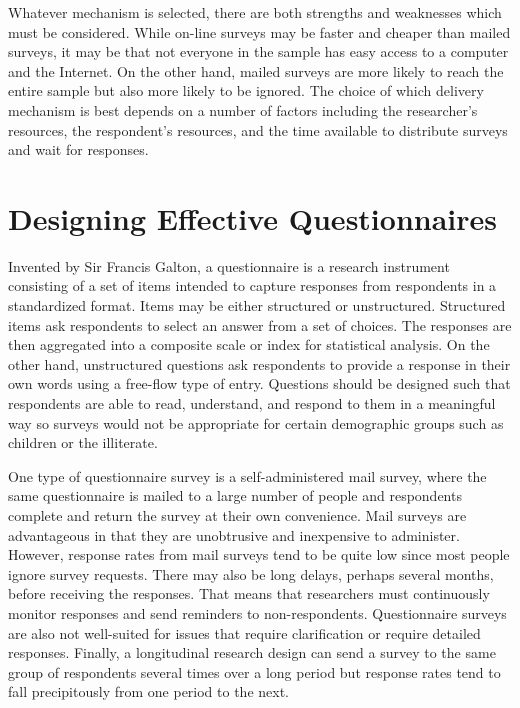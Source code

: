 Whatever mechanism is selected, there are both strengths and weaknesses which must be considered. While on-line surveys may be faster and cheaper than mailed surveys, it may be that not everyone in the sample has easy access to a computer and the Internet. On the other hand, mailed surveys are more likely to reach the entire sample but also more likely to be ignored. The choice of which delivery mechanism is best depends on a number of factors including the researcher's resources, the respondent's resources, and the time available to distribute surveys and wait for responses.

\section{Designing Effective Questionnaires}

Invented by Sir Francis Galton, a questionnaire is a research instrument consisting of a set of items intended to capture responses from respondents in a standardized format. Items may be either structured or unstructured. Structured items ask respondents to select an answer from a set of choices. The responses are then aggregated into a composite scale or index for statistical analysis. On the other hand, unstructured questions ask respondents to provide a response in their own words using a free-flow type of entry. Questions should be designed such that respondents are able to read, understand, and respond to them in a meaningful way so surveys would not be appropriate for certain demographic groups such as children or the illiterate. 

One type of questionnaire survey is a self-administered mail survey, where the same questionnaire is mailed to a large number of people and respondents complete and return the survey at their own convenience. Mail surveys are advantageous in that they are unobtrusive and inexpensive to administer. However, response rates from mail surveys tend to be quite low since most people ignore survey requests. There may also be long delays, perhaps several months, before receiving the responses. That means that researchers must continuously monitor responses and send reminders to non-respondents. Questionnaire surveys are also not well-suited for issues that require clarification or require detailed responses. Finally, a longitudinal research design can send a survey to the same group of respondents several times over a long period but response rates tend to fall precipitously from one period to the next.

